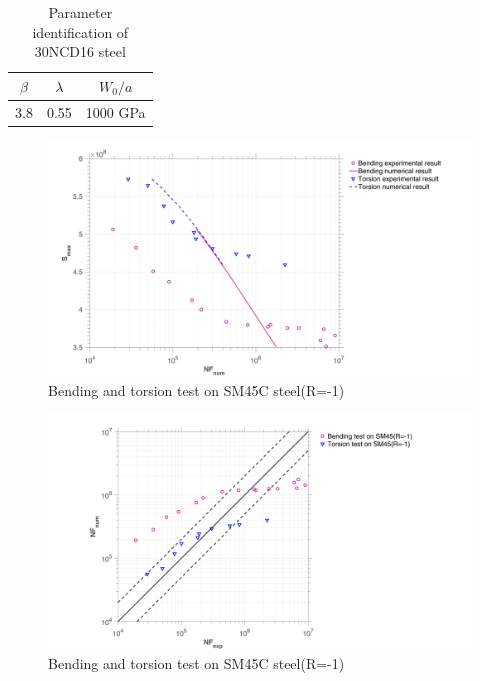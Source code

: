 \documentclass[3p,times,number,review]{elsarticle}
\begin{document}
\begin{table}[!h]
	\centering
	\begin{tabular}{|c|c|c|}
		\hline
		\textbf{$\beta$} & \textbf{$\lambda$}  & \textbf{$W_0/a$}  \\ \hline
	 3.8        & 0.55            & 1000 GPa       \\ \hline
	\end{tabular}
	\caption{Parameter identification of 30NCD16 steel}
	\label{sm45cpara}
\end{table}

\begin{figure}[!h]
	\centering
	\includegraphics[width=\textwidth]{figures//bt1D_SM45C_sn.png} 
	\caption{Bending and torsion test on SM45C steel(R=-1)}
	\label{fig.bt1DSM45Csn}
\end{figure}
\begin{figure}[!h]
	\centering
	\includegraphics[width=\textwidth]{figures//bt1D_SM45C_err1.png} 
	\caption{Bending and torsion test on SM45C steel(R=-1)}
	\label{fig.bt1DSM45Cerr1}
\end{figure}
\end{document}

